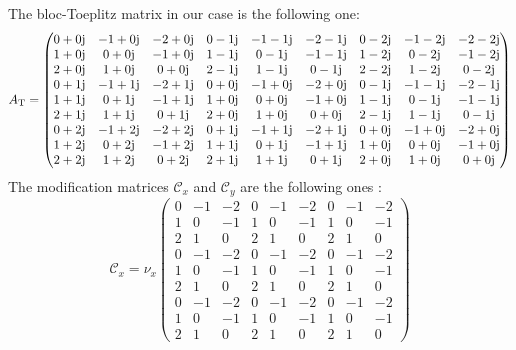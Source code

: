 The bloc-Toeplitz matrix in our case is the following one:
{\footnotesize
\begin{equation}
A_\mathrm{T}=
\begin{pmatrix}
  0 + 0\mathrm{j} & -1 + 0\mathrm{j}&  -2 + 0\mathrm{j} &  0 - 1\mathrm{j} & -1 - 1\mathrm{j} & -2 - 1\mathrm{j} &  0 - 2\mathrm{j} & -1 - 2\mathrm{j} & -2 - 2\mathrm{j} \\
   1 + 0\mathrm{j} &  0 + 0\mathrm{j} & -1 + 0\mathrm{j} &  1 - 1\mathrm{j} &  0 - 1\mathrm{j} & -1 - 1\mathrm{j} &  1 - 2\mathrm{j} &  0 - 2\mathrm{j} & -1 - 2\mathrm{j} \\
   2 + 0\mathrm{j} &  1 + 0\mathrm{j} &  0 + 0\mathrm{j} &  2 - 1\mathrm{j} &  1 - 1\mathrm{j} &  0 - 1\mathrm{j} &  2 - 2\mathrm{j} &  1 - 2\mathrm{j} &  0 - 2\mathrm{j}\\
   0 + 1\mathrm{j} & -1 + 1\mathrm{j} & -2 + 1\mathrm{j} &  0 + 0\mathrm{j} & -1 + 0\mathrm{j} & -2 + 0\mathrm{j} &  0 - 1\mathrm{j} & -1 - 1\mathrm{j} & -2 - 1\mathrm{j}\\
   1 + 1\mathrm{j} &  0 + 1\mathrm{j} & -1 + 1\mathrm{j} &  1 + 0\mathrm{j} &  0 + 0\mathrm{j} & -1 + 0\mathrm{j} &  1 - 1\mathrm{j} &  0 - 1\mathrm{j} & -1 - 1\mathrm{j}\\
   2 + 1\mathrm{j} &  1 + 1\mathrm{j} &  0 + 1\mathrm{j} &  2 + 0\mathrm{j} &  1 + 0\mathrm{j} &  0 + 0\mathrm{j} &  2 - 1\mathrm{j} &  1 - 1\mathrm{j} &  0 - 1\mathrm{j}\\
   0 + 2\mathrm{j} & -1 + 2\mathrm{j} & -2 + 2\mathrm{j} &  0 + 1\mathrm{j} & -1 + 1\mathrm{j} & -2 + 1\mathrm{j} &  0 + 0\mathrm{j} & -1 + 0\mathrm{j} & -2 + 0\mathrm{j}\\
   1 + 2\mathrm{j} &  0 + 2\mathrm{j} & -1 + 2\mathrm{j} &  1 + 1\mathrm{j} &  0 + 1\mathrm{j} & -1 + 1\mathrm{j} &  1 + 0\mathrm{j} &  0 + 0\mathrm{j} & -1 + 0\mathrm{j}\\
   2 + 2\mathrm{j} &  1 + 2\mathrm{j} &  0 + 2\mathrm{j} &  2 + 1\mathrm{j} &  1 + 1\mathrm{j} &  0 + 1\mathrm{j} &  2 + 0\mathrm{j} &  1 + 0\mathrm{j} &  0 + 0\mathrm{j}
\end{pmatrix}
\end{equation}
}
The modification matrices $\mathcal{C}_x$ and $\mathcal{C}_y$ are the following ones :
\begin{equation}
\mathcal{C}_x= \nu_x
\begin{pmatrix}
   0 & -1 & -2 &  0 & -1 & -2 &  0 & -1 & -2\\
   1 &  0 & -1 &  1 &  0 & -1 &  1 &  0 & -1\\
   2 &  1 &  0 &  2 &  1 &  0 &  2 &  1 &  0\\
   0 & -1 & -2 &  0 & -1 & -2 &  0 & -1 & -2\\
   1 &  0 & -1 &  1 &  0 & -1 &  1 &  0 & -1\\
   2 &  1 &  0 &  2 &  1 &  0 &  2 &  1 &  0\\
   0 & -1 & -2 &  0 & -1 & -2 &  0 & -1 & -2\\
   1 &  0 & -1 &  1 &  0 & -1 &  1 &  0 & -1\\
   2 &  1 &  0 &  2 &  1 &  0 &  2 &  1 &  0
\end{pmatrix}
\end{equation}
